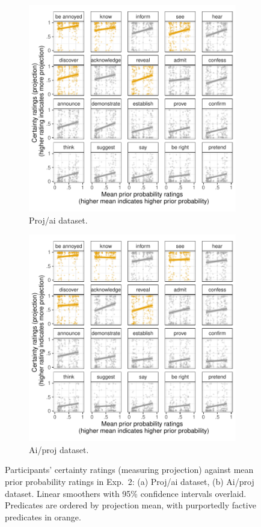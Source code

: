 \documentclass[11pt,fleqn]{article}
\newcommand{\6}{\mbox{$[\hspace*{-.6mm}[$}}
\newcommand{\9}{\mbox{$]\hspace*{-.6mm}]$}}
\begin{document}
\begin{figure}[h!]
\centering
\begin{subfigure}[t]{0.49\textwidth}
\centering
\includegraphics[width=.9\textwidth]{../../results/exp2/graphs/SUP-projai-projection-by-prior}
\caption{Proj/ai dataset.}
\end{subfigure} \hfill \begin{subfigure}[t]{0.49\textwidth}
\centering
\includegraphics[width=.9\textwidth]{../../results/exp2/graphs/SUP-aiproj-projection-by-prior}
\caption{Ai/proj dataset.}
 \end{subfigure}
 
  
\caption{Participants' certainty ratings (measuring projection) against mean prior probability ratings in Exp.~2: (a) Proj/ai dataset, (b) Ai/proj dataset. Linear smoothers with 95\% confidence intervals overlaid. Predicates are ordered by projection mean, with purportedly factive predicates in orange.}
\end{figure}
\end{document}

